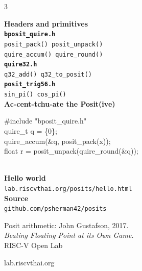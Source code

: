 \documentclass[10pt]{article}
\begin{document}
\begin{multicols}{3}
\begin{center}
  {\small
  \textbf{Headers and primitives}\\[3pt]
  \textbf{\texttt{bposit\_quire.h}}\\
  \quad\texttt{posit\_pack() \quad posit\_unpack()}\\
  \quad\texttt{quire\_accum() \quad quire\_round()}\\[3pt]
  \textbf{\texttt{quire32.h}}\\
  \quad\texttt{q32\_add() \quad q32\_to\_posit()}\\[3pt]
  \textbf{\texttt{posit\_trig56.h}}\\
  \quad\texttt{sin\_pi() \quad cos\_pi()}\\[6pt]
  \textbf{Ac-cent-tchu-ate the Posit(ive) \quarternote\eighthnote}\\[3pt]
  \begin{minipage}{0.85\linewidth}
  \ttfamily\footnotesize
  \#include "bposit\_quire.h"\\
  quire\_t q = \{0\};\\
  quire\_accum(\&q, posit\_pack(x));\\
  float r = posit\_unpack(quire\_round(\&q));
  \end{minipage}\\[6pt]
  \textbf{Hello world}\\
  \texttt{\footnotesize lab.riscvthai.org/posits/hello.html}\\[3pt]
  \textbf{Source}\\
  \texttt{\footnotesize github.com/psherman42/posits \quad [fe310]}\\[1em]
  }

  {\footnotesize
  Posit arithmetic: John Gustafson, 2017.\\
  \textit{Beating Floating Point at its Own Game.}\\[4pt]
  RISC-V Open Lab\\
  }

  \vfill
  {\footnotesize\ttfamily lab.riscvthai.org}
\end{center}

\end{multicols}
\end{document}
